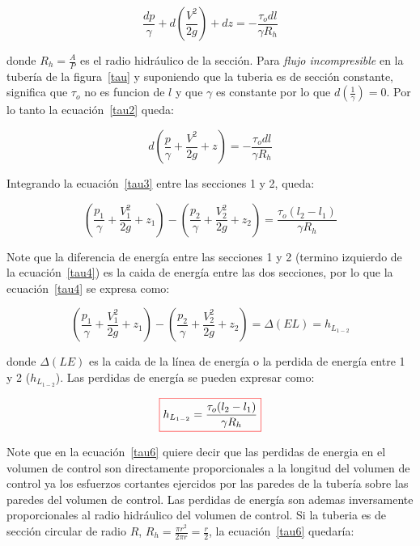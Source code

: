 \documentclass[10pt, oneside]{article}
\begin{document}
\begin{equation}
\frac{dp}{\gamma} + d\left( \frac{V^2}{2g} \right) + dz = -\frac{\tau_{o} dl}{\gamma R_h}
\label{tau2}
\end{equation}

donde $R_h = \frac{A}{P}$ es el radio hidr\'aulico de la secci\'on. Para \emph{flujo incompresible} en la tuber\'ia de la figura~\ref{tau}  y suponiendo que la tuberia es de secci\'on constante, significa que $\tau_{o}$ no es funcion de $l$ y que $\gamma$ es constante por lo que $d\left( \frac{1}{\gamma} \right)=0$. Por lo tanto la ecuaci\'on~\ref{tau2} queda:

\begin{equation}
d \left( \frac{p}{\gamma} +\frac{V^2}{2g} + z \right) = -\frac{\tau_o dl}{\gamma R_h}
\label{tau3}
\end{equation}

Integrando la ecuaci\'on~\ref{tau3} entre las secciones 1 y 2, queda: 

\begin{equation}
\left( \frac{p_1}{\gamma} +\frac{V_1^2}{2g} + z_1 \right) - \left( \frac{p_2}{\gamma} +\frac{V_2^2}{2g} + z_2 \right) = \frac{\tau_o (l_2 - l_1 )}{\gamma R_h}  
\label{tau4}
\end{equation}

Note que la diferencia de energ\'ia entre las secciones 1 y 2 (termino izquierdo de la ecuaci\'on~\ref{tau4}) es la caida de energ\'ia entre las dos secciones, por lo que la ecuaci\'on~\ref{tau4} se expresa como:

\begin{equation}
\left( \frac{p_1}{\gamma} +\frac{V_1^2}{2g} + z_1 \right) - \left( \frac{p_2}{\gamma} +\frac{V_2^2}{2g} + z_2 \right) = \Delta (EL) = h_{L_{1-2}}
\label{tau5}
\end{equation}

donde $\Delta (LE)$ es la caida de la l\'inea de energ\'ia o la perdida de energ\'ia entre 1 y 2 ($h_{L_{1-2}}$). Las perdidas de energ\'ia se pueden expresar como:

\begin{equation}
\color{red}\boxed{\color{black} h_{L_{1-2}} = \frac{\tau_o (l_2 - l_1 )}{\gamma R_h} }  
\label{tau6}
\end{equation}

Note que en la ecuaci\'on~\ref{tau6} quiere decir que las perdidas de energia en el volumen de control son directamente proporcionales a la longitud del volumen de control ya los esfuerzos cortantes ejercidos por las paredes de la tuber\'ia sobre las paredes del volumen de control. Las perdidas de energ\'ia son ademas inversamente proporcionales al radio hidr\'aulico del volumen de control. Si la tuberia es de secci\'on circular de radio $R$, $R_h = \frac{\pi r^2}{2\pi r} = \frac{r}{2}$,  la ecuaci\'on~\ref{tau6} quedar\'ia:
\end{document}
